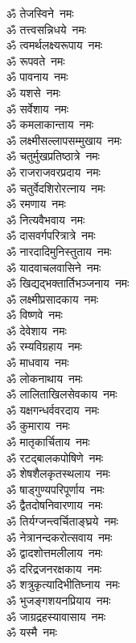 \begin{multicols}{2}
\begin{flushleft}
        ॐ तेजस्विने~नमः\\
        ॐ तत्त्वसन्निधये~नमः\\
        ॐ त्वमर्थलक्ष्यरूपाय~नमः\\
        ॐ रूपवते~नमः\\
        ॐ पावनाय~नमः\\
        ॐ यशसे~नमः\\
        ॐ सर्वेशाय~नमः\\
        ॐ कमलाकान्ताय~नमः\\
        ॐ लक्ष्मीसल्लापसम्मुखाय~नमः\\
        ॐ चतुर्मुखप्रतिष्ठात्रे~नमः\hfill{}\\
                                                        
        ॐ राजराजवरप्रदाय~नमः\\
        ॐ चतुर्वेदशिरोरत्नाय~नमः\\
        ॐ रमणाय~नमः\\
        ॐ नित्यवैभवाय~नमः\\
        ॐ दासवर्गपरित्रात्रे~नमः\\
        ॐ नारदादिमुनिस्तुताय~नमः\\
        ॐ यादवाचलवासिने~नमः\\
        ॐ खिद्यद्भक्तार्तिभञ्जनाय~नमः\\
        ॐ लक्ष्मीप्रसादकाय~नमः\\
        ॐ विष्णवे~नमः\hfill{}\\
                                                        
        ॐ देवेशाय~नमः\\
        ॐ रम्यविग्रहाय~नमः\\
        ॐ माधवाय~नमः\\
        ॐ लोकनाथाय~नमः\\
        ॐ लालिताखिलसेवकाय~नमः\\
        ॐ यक्षगन्धर्ववरदाय~नमः\\
        ॐ कुमाराय~नमः\\
        ॐ मातृकार्चिताय~नमः\\
        ॐ रटद्बालकपोषिणे~नमः\\
        ॐ शेषशैलकृतस्थलाय~नमः\hfill{}\\
                                                        
        ॐ षाड्गुण्यपरिपूर्णाय~नमः\\
        ॐ द्वैतदोषनिवारणाय~नमः\\
        ॐ तिर्यग्जन्त्वर्चिताङ्घ्रये~नमः\\
        ॐ नेत्रानन्दकरोत्सवाय~नमः\\
        ॐ द्वादशोत्तमलीलाय~नमः\\
        ॐ दरिद्रजनरक्षकाय~नमः\\
        ॐ शत्रुकृत्यादिभीतिघ्नाय~नमः\\
        ॐ भुजङ्गशयनप्रियाय~नमः\\
        ॐ जाग्रद्रहस्यावासाय~नमः\\
        ॐ यस्मै~नमः\hfill{}\\
        

\end{flushleft}
\end{multicols}
